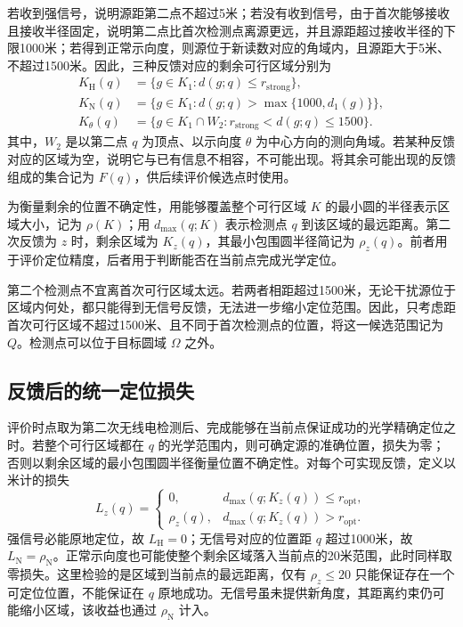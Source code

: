 \documentclass[UTF8,a4paper,zihao=-4,fontset=none]{ctexart}
\begin{document}
若收到强信号，说明源距第二点不超过5米；若没有收到信号，由于首次能够接收且接收半径固定，说明第二点比首次检测点离源更远，并且源距超过接收半径的下限1000米；若得到正常示向度，则源位于新读数对应的角域内，且源距大于5米、不超过1500米。因此，三种反馈对应的剩余可行区域分别为
\begin{equation}
\begin{aligned}
K_{\mathrm H}(q)&=\{g\in K_1:d(g;q)\le r_{\mathrm{strong}}\},\\
K_{\mathrm N}(q)&=\{g\in K_1:d(g;q)>\max\{1000,d_1(g)\}\},\\
K_\theta(q)&=\{g\in K_1\cap W_2:r_{\mathrm{strong}}<d(g;q)\le1500\}.
\end{aligned}
\label{eq:q2-pair-regions}
\end{equation}
其中，\(W_2\) 是以第二点 \(q\) 为顶点、以示向度 \(\theta\) 为中心方向的测向角域。若某种反馈对应的区域为空，说明它与已有信息不相容，不可能出现。将其余可能出现的反馈组成的集合记为 \(F(q)\)，供后续评价候选点时使用。

为衡量剩余的位置不确定性，用能够覆盖整个可行区域 \(K\) 的最小圆的半径表示区域大小，记为 \(\rho(K)\)；用 \(d_{\max}(q;K)\) 表示检测点 \(q\) 到该区域的最远距离。第二次反馈为 \(z\) 时，剩余区域为 \(K_z(q)\)，其最小包围圆半径简记为 \(\rho_z(q)\)。前者用于评价定位精度，后者用于判断能否在当前点完成光学定位。

第二个检测点不宜离首次可行区域太远。若两者相距超过1500米，无论干扰源位于区域内何处，都只能得到无信号反馈，无法进一步缩小定位范围。因此，只考虑距首次可行区域不超过1500米、且不同于首次检测点的位置，将这一候选范围记为 \(Q\)。检测点可以位于目标圆域 \(\Omega\) 之外。

\subsection{反馈后的统一定位损失}

评价时点取为第二次无线电检测后、完成能够在当前点保证成功的光学精确定位之时。若整个可行区域都在 \(q\) 的光学范围内，则可确定源的准确位置，损失为零；否则以剩余区域的最小包围圆半径衡量位置不确定性。对每个可实现反馈，定义以米计的损失
\begin{equation}
 L_z(q)=
 \begin{cases}
 0,&d_{\max}(q;K_z(q))\le r_{\mathrm{opt}},\\
 \rho_z(q),&d_{\max}(q;K_z(q))>r_{\mathrm{opt}}.
 \end{cases}
\label{eq:q2-pair-loss}
\end{equation}
强信号必能原地定位，故 \(L_{\mathrm H}=0\)；无信号对应的位置距 \(q\) 超过1000米，故 \(L_{\mathrm N}=\rho_{\mathrm N}\)。正常示向度也可能使整个剩余区域落入当前点的20米范围，此时同样取零损失。这里检验的是区域到当前点的最远距离，仅有 \(\rho_z\le20\) 只能保证存在一个可定位位置，不能保证在 \(q\) 原地成功。无信号虽未提供新角度，其距离约束仍可能缩小区域，该收益也通过 \(\rho_{\mathrm N}\) 计入。
\end{document}
